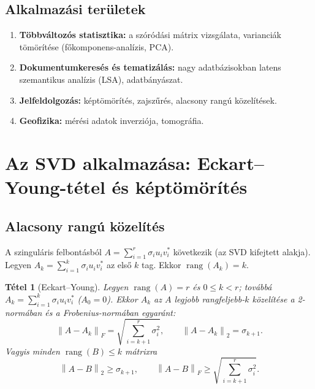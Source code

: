 \documentclass[a4paper,12pt]{article}
\theoremstyle{mydef}
\newtheorem{tetel}{Tétel}[section]
\newcommand{\norm}[1]{\left\|#1\right\|}
\DeclareMathOperator{\rang}{rang}
\begin{document}
\subsection*{Alkalmazási területek}

\begin{enumerate}[noitemsep,topsep=2pt]
  \item \textbf{Többváltozós statisztika:} a szóródási mátrix vizsgálata, varianciák tömörítése
        (főkomponens-analízis, PCA).
  \item \textbf{Dokumentumkeresés és tematizálás:} nagy adatbázisokban latens szemantikus
        analízis (LSA), adatbányászat.
  \item \textbf{Jelfeldolgozás:} képtömörítés, zajszűrés, alacsony rangú közelítések.
  \item \textbf{Geofizika:} mérési adatok inverziója, tomográfia.
\end{enumerate}

\section{Az SVD alkalmazása: Eckart--Young-tétel és képtömörítés}
\label{sec:eckartyoung}

\subsection*{Alacsony rangú közelítés}

A szinguláris felbontásból $A = \sum_{i=1}^r \sigma_i u_i v_i^*$ következik
(az SVD kifejtett alakja). Legyen $A_k = \sum_{i=1}^k \sigma_i u_i v_i^*$ az első $k$ tag.
Ekkor $\rang(A_k) = k$.

\begin{mdframed}[backgroundcolor=thmbg,linewidth=0pt,innertopmargin=8pt,innerbottommargin=8pt]
\begin{tetel}[Eckart--Young]
\label{tetel:ey}
Legyen $\rang(A) = r$ és $0\le k<r$; továbbá
$A_k=\sum_{i=1}^k \sigma_i u_i v_i^*$ ($A_0=0$). Ekkor $A_k$ az $A$ legjobb
rangfeljebb-$k$ közelítése a 2-normában \emph{és} a Frobenius-normában egyaránt:
\[
  \norm{A - A_k}_F = \sqrt{\sum_{i=k+1}^r \sigma_i^2}, \qquad
  \norm{A - A_k}_2 = \sigma_{k+1}.
\]
Vagyis minden $\rang(B) \le k$ mátrixra
\[
  \norm{A-B}_2\ge \sigma_{k+1},\qquad
  \norm{A-B}_F\ge \sqrt{\sum_{i=k+1}^r\sigma_i^2}.
\]
\end{tetel}
\end{mdframed}
\end{document}
